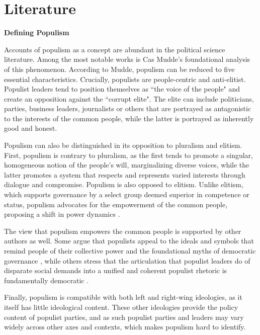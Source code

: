 \documentclass[12pt,letterpaper]{article}
\begin{document}
\section*{Literature} 

\vspace{.25cm}
\textbf{Defining Populism}
\vspace{.25cm}

\noindent Accounts of populism as a concept are abundant in the political science literature. Among the most notable works is Cas Mudde's foundational analysis of this phenomenon. According to Mudde, populism can be reduced to five essential characteristics. Crucially, populists are people-centric and anti-elitist. Populist leaders tend to position themselves as ``the voice of the people" and create an opposition against the ``corrupt elite". The elite can include politicians, parties, business leaders, journalists or others that are portrayed as antagonistic to the interests of the common people, while the latter is portrayed as inherently good and honest\autocite{muddePopulistZeitgeist2004}.

Populism can also be distinguished in its opposition to pluralism and elitism. First, populism is contrary to pluralism, as the first tends to promote a singular, homogeneous notion of the people's will, marginalizing diverse voices, while the latter promotes a system that respects and represents varied interests through dialogue and compromise. Populism is also opposed to elitism. Unlike elitism, which supports governance by a select group deemed superior in competence or status, populism advocates for the empowerment of the common people, proposing a shift in power dynamics \autocite{muddePopulismVeryShort2017}.

The view that populism empowers the common people is supported by other authors as well. Some argue that populists appeal to the ideals and symbols that remind people of their collective power and the foundational myths of democratic governance \autocite{canovanTrustPeoplePopulism1999}, while others stress that the articulation that populist leaders do of disparate social demands into a unified and coherent populist rhetoric is fundamentally democratic \autocite{benvenutoPopulistReasonErnesto2012}.

Finally, populism is compatible with both left and right-wing ideologies, as it itself has little ideological content. These other ideologies provide the policy content of populist parties, and as such populist parties and leaders may vary widely across other axes and contexts, which makes populism hard to identify\autocite{muddePopulistZeitgeist2004}.
\end{document}
